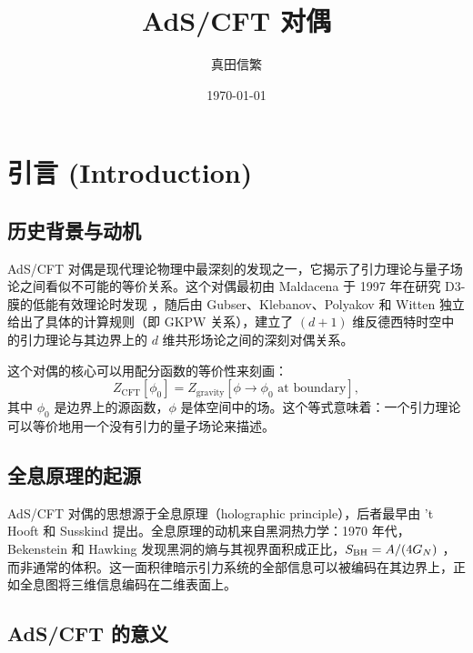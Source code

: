 \documentclass[lang=cn,10pt,chinese]{elegantbook}
\title{AdS/CFT 对偶}
\author{真田信繁}
\institute{Your Institute}
\date{\today}
\begin{document}
\maketitle
\frontmatter

\tableofcontents

\mainmatter

\chapter{引言 (Introduction)}

\section{历史背景与动机}

AdS/CFT 对偶是现代理论物理中最深刻的发现之一，它揭示了引力理论与量子场论之间看似不可能的等价关系。这个对偶最初由 Maldacena 于 1997 年在研究 D3-膜的低能有效理论时发现 \cite{Maldacena1997}，随后由 Gubser、Klebanov、Polyakov \cite{Gubser1998} 和 Witten \cite{Witten1998} 独立给出了具体的计算规则（即 GKPW 关系），建立了 $(d+1)$ 维反德西特时空中的引力理论与其边界上的 $d$ 维共形场论之间的深刻对偶关系。

这个对偶的核心可以用配分函数的等价性来刻画：
\begin{equation}
    Z_{\text{CFT}}[\phi_0] = Z_{\text{gravity}}[\phi \to \phi_0 \text{ at boundary}],
\end{equation}
其中 $\phi_0$ 是边界上的源函数，$\phi$ 是体空间中的场。这个等式意味着：一个引力理论可以等价地用一个没有引力的量子场论来描述。

\section{全息原理的起源}

AdS/CFT 对偶的思想源于全息原理（holographic principle），后者最早由 't Hooft 和 Susskind 提出。全息原理的动机来自黑洞热力学：1970 年代，Bekenstein 和 Hawking 发现黑洞的熵与其视界面积成正比，$S_{\rm BH} = A/(4G_N)$ \cite{Bekenstein1973, Hawking1975}，而非通常的体积。这一面积律暗示引力系统的全部信息可以被编码在其边界上，正如全息图将三维信息编码在二维表面上。

\section{AdS/CFT 的意义}
\end{document}
